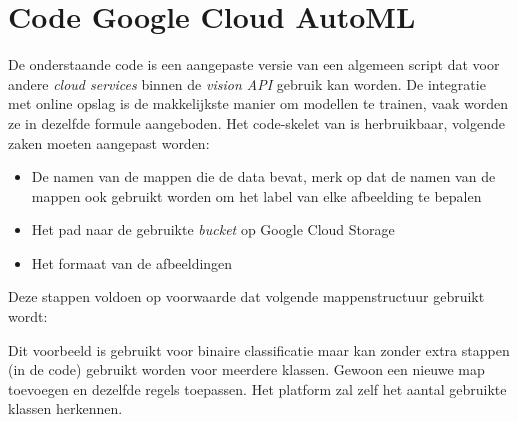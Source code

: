 
\chapter{Code Google Cloud AutoML}
\label{ch:app:google-automl}

De onderstaande code is een aangepaste versie van een algemeen script dat voor andere \textit{cloud services} binnen de \textit{vision API} gebruik kan worden. De integratie met online opslag is de makkelijkste manier om modellen te trainen, vaak worden ze in dezelfde formule aangeboden. Het code-skelet van \textcite{Guo2018} is herbruikbaar, volgende zaken moeten aangepast worden:

\begin{itemize}
    \item De namen van de mappen die de data bevat, merk op dat de namen van de mappen ook gebruikt worden om het label van elke afbeelding te bepalen
    \item Het pad naar de gebruikte \textit{bucket} op Google Cloud Storage
    \item Het formaat van de afbeeldingen
\end{itemize}

Deze stappen voldoen op voorwaarde dat volgende mappenstructuur gebruikt wordt:


Dit voorbeeld is gebruikt voor binaire classificatie maar kan zonder extra stappen (in de code) gebruikt worden voor meerdere klassen. Gewoon een nieuwe map toevoegen en dezelfde regels toepassen. Het platform zal zelf het aantal gebruikte klassen herkennen.

